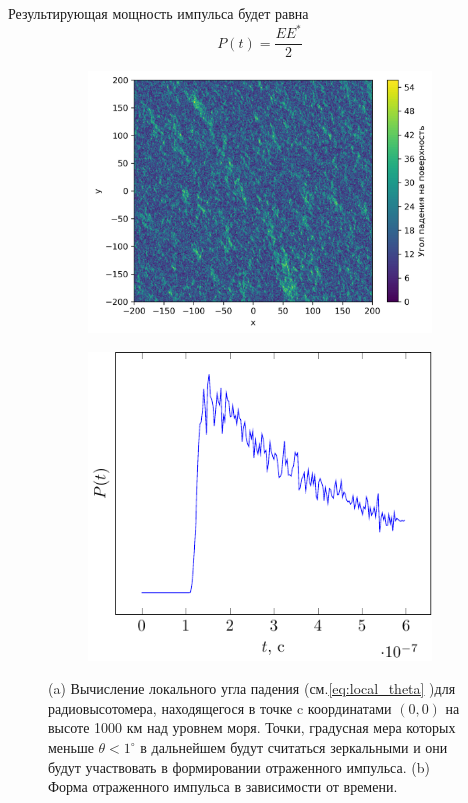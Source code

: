  Результирующая мощность импульса будет равна
 \begin{equation}
     P(t) = \frac{EE^*}{2}
 \end{equation}
 \begin{figure}[h]
     \begin{subfigure}{.55\linewidth}
         \centering
         \includegraphics[width=\linewidth]{img/theta0}
         \caption{}
     \end{subfigure}
     \hfill
     \begin{subfigure}{.45\linewidth}
         \centering
         \includegraphics[width=\linewidth]{fig/theta}
         \caption{}
     \end{subfigure}
     \caption{(a) Вычисление локального угла падения (см.\eqref{eq:local_theta}
         )для радиовысотомера, находящегося в точке c координатами $(0,0)$ на
         высоте 1000 км над уровнем моря.  Точки, градусная мера которых меньше
         $\theta<1^\circ$ в дальнейшем будут считаться зеркальными и они будут
         участвовать в формировании отраженного импульса.  (b) Форма
     отраженного импульса в зависимости от времени.}
    \label{fig:model_impuls}
 \end{figure}


